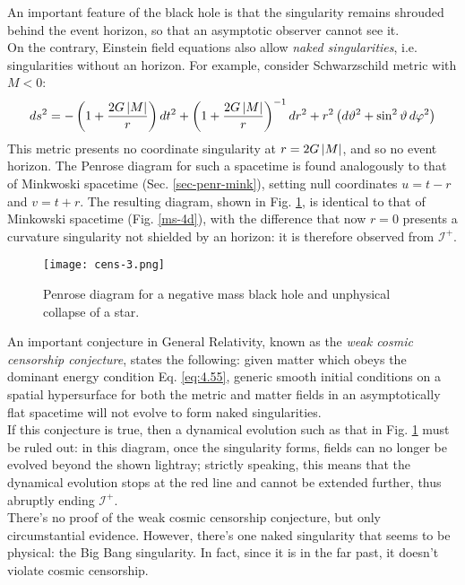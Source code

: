 An important feature of the black hole is that the singularity remains shrouded behind the event horizon, so that an asymptotic observer cannot see it.\\
On the contrary, Einstein field equations also allow \textit{naked singularities}, i.e. singularities without an horizon. For example, consider Schwarzschild metric with $ M < 0 $:
\begin{equation*}
  ds^2 = - \left( 1 + \frac{2G \left\lvert M\right\rvert}{r} \right) dt^2 + \left( 1 + \frac{2G \left\lvert M\right\rvert}{r} \right)^{-1} dr^2 + r^2 \left( d\vartheta^2 + \sin^2 \vartheta \, d\varphi^2 \right)
\end{equation*}
This metric presents no coordinate singularity at $ r = 2G \left\lvert M\right\rvert $, and so no event horizon. The Penrose diagram for such a spacetime is found analogously to that of Minkwoski spacetime (Sec. \ref{sec-penr-mink}), setting null coordinates $ u = t - r $ and $ v = t + r $. The resulting diagram, shown in Fig. \ref{cens-3}, is identical to that of Minkowski spacetime (Fig. \ref{ms-4d}), with the difference that now $ r = 0 $ presents a curvature singularity not shielded by an horizon: it is therefore observed from $ \mathcal{I}^+ $.

\begin{figure}
  \centering
  \texttt{[image: cens-3.png]}
  \caption{Penrose diagram for a negative mass black hole and unphysical collapse of a star.}
  \label{cens-3}
\end{figure}

An important conjecture in General Relativity, known as the \textit{weak cosmic censorship conjecture}, states the following: given matter which obeys the dominant energy condition Eq. \ref{eq:4.55}, generic smooth initial conditions on a spatial hypersurface for both the metric and matter fields in an asymptotically flat spacetime will not evolve to form naked singularities.\\
If this conjecture is true, then a dynamical evolution such as that in Fig. \ref{cens-3} must be ruled out: in this diagram, once the singularity forms, fields can no longer be evolved beyond the shown lightray; strictly speaking, this means that the dynamical evolution stops at the red line and cannot be extended further, thus abruptly ending $ \mathcal{I}^+ $.\\
There's no proof of the weak cosmic censorship conjecture, but only circumstantial evidence. However, there's one naked singularity that seems to be physical: the Big Bang singularity. In fact, since it is in the far past, it doesn't violate cosmic censorship.


